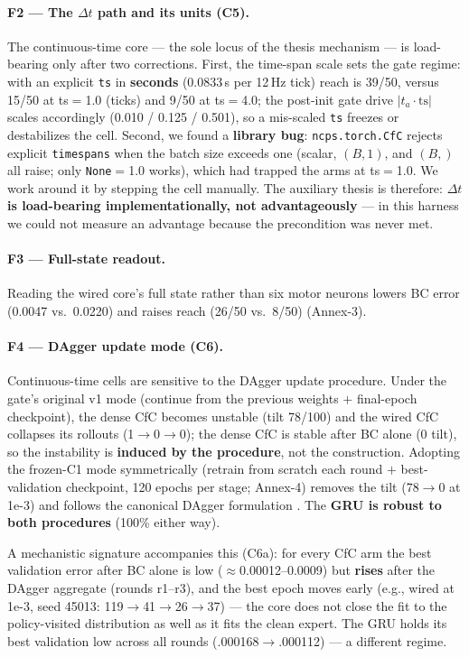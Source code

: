 \documentclass[11pt]{article}
\begin{document}
\paragraph{F2 --- The $\Delta t$ path and its units (C5).} The continuous-time core --- the sole locus of the thesis mechanism --- is load-bearing only after two corrections. First, the time-span scale sets the gate regime: with an explicit \texttt{ts} in \textbf{seconds} (0.0833\,s per 12\,Hz tick) reach is 39/50, versus 15/50 at ts$=$1.0 (ticks) and 9/50 at ts$=$4.0; the post-init gate drive $|t_a\cdot\text{ts}|$ scales accordingly (0.010 / 0.125 / 0.501), so a mis-scaled \texttt{ts} freezes or destabilizes the cell. Second, we found a \textbf{library bug}: \texttt{ncps.torch.CfC} rejects explicit \texttt{timespans} when the batch size exceeds one (scalar, $(B,1)$, and $(B,)$ all raise; only \texttt{None}$=$1.0 works), which had trapped the arms at ts$=$1.0. We work around it by stepping the cell manually. The auxiliary thesis is therefore: \textbf{$\Delta t$ is load-bearing implementationally, not advantageously} --- in this harness we could not measure an advantage because the precondition was never met.

\paragraph{F3 --- Full-state readout.} Reading the wired core's full state rather than six motor neurons lowers BC error (0.0047 vs.\ 0.0220) and raises reach (26/50 vs.\ 8/50) (Annex-3).

\paragraph{F4 --- DAgger update mode (C6).} Continuous-time cells are sensitive to the DAgger update procedure. Under the gate's original v1 mode (continue from the previous weights $+$ final-epoch checkpoint), the dense CfC becomes unstable (tilt 78/100) and the wired CfC collapses its rollouts (1$\to$0$\to$0); the dense CfC is stable after BC alone (0 tilt), so the instability is \textbf{induced by the procedure}, not the construction. Adopting the frozen-C1 mode symmetrically (retrain from scratch each round $+$ best-validation checkpoint, 120 epochs per stage; Annex-4) removes the tilt (78$\to$0 at 1e-3) and follows the canonical DAgger formulation \citep{ross2011dagger}. The \textbf{GRU is robust to both procedures} (100\% either way).

A mechanistic signature accompanies this (C6a): for every CfC arm the best validation error after BC alone is low ($\approx$0.00012--0.0009) but \textbf{rises} after the DAgger aggregate (rounds r1--r3), and the best epoch moves early (e.g., wired at 1e-3, seed 45013: 119$\to$41$\to$26$\to$37) --- the core does not close the fit to the policy-visited distribution as well as it fits the clean expert. The GRU holds its best validation low across all rounds (.000168$\to$.000112) --- a different regime.
\end{document}
